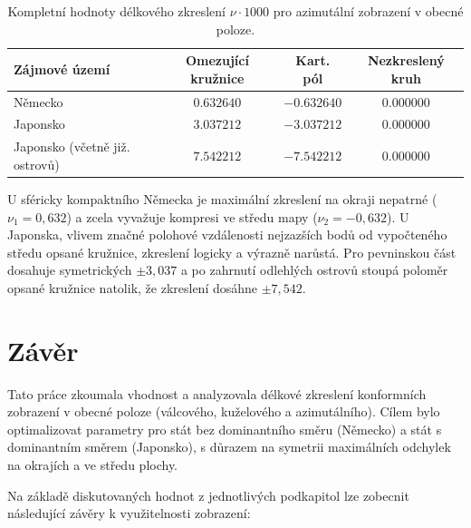 \begin{table}[h!]
	\centering
	\renewcommand{\arraystretch}{1.3}
	\begin{tabular}{|l|c|c|c|}
		\hline
		\textbf{Zájmové území} & \textbf{Omezující kružnice} & \textbf{Kart. pól} & \textbf{Nezkreslený kruh} \\ \hline\hline
		Německo & $0.632640$ & $-0.632640$ & $0.000000$ \\ \hline
		Japonsko & $3.037212$ & $-3.037212$ & $0.000000$ \\ \hline
		Japonsko (včetně již. ostrovů) & $7.542212 $ & $-7.542212$ & $0.000000$ \\ \hline
	\end{tabular}
	\vspace{0.2cm}
	\caption{Kompletní hodnoty délkového zkreslení $\nu \cdot 1000$ pro azimutální zobrazení v obecné poloze.}
	\label{tab_vsechna_zkresleni_azimut}
\end{table}



U sféricky kompaktního Německa je maximální zkreslení na okraji nepatrné ($\nu_1 = 0,632$) a zcela vyvažuje kompresi ve středu mapy ($\nu_2 = -0,632$). U Japonska, vlivem značné polohové vzdálenosti nejzazších bodů od vypočteného středu opsané kružnice, zkreslení logicky a výrazně narůstá. Pro pevninskou část dosahuje symetrických $\pm 3,037$ a po zahrnutí odlehlých ostrovů stoupá poloměr opsané kružnice natolik, že zkreslení dosáhne $\pm 7,542$.



\newpage
\section{Závěr}
Tato práce zkoumala vhodnost a analyzovala délkové zkreslení konformních zobrazení v obecné poloze (válcového, kuželového a azimutálního). Cílem bylo optimalizovat parametry pro stát bez dominantního směru (Německo) a stát s dominantním směrem (Japonsko), s důrazem na symetrii maximálních odchylek na okrajích a ve středu plochy.

Na základě diskutovaných hodnot z jednotlivých podkapitol lze zobecnit následující závěry k využitelnosti zobrazení:

